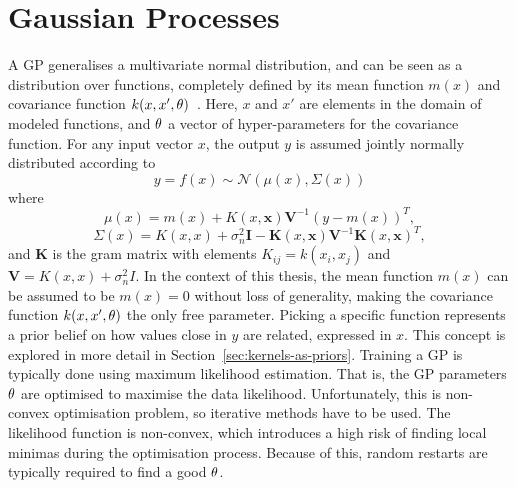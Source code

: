 
\section{Gaussian Processes}
A GP generalises a multivariate normal distribution, and can be seen
as a distribution over functions, completely defined by its
mean function $m(x)$ and covariance function $k(x, x', \theta)$~\cite{Rasmussen-Williams-2006}. 
Here, $x$ and $x'$ are
elements in the domain of modeled functions, and $\theta$ a
vector of hyper-parameters for the covariance function. For any input
vector $x$, the output $y$ is assumed jointly normally distributed according to
\begin{equation}
  \label{eq:gp}
  y = f(x) \sim \mathcal{N}(\mu(x), \Sigma(x))
\end{equation}
where
\begin{equation}
  \label{eq:gp-mean-function}
  \mu(x) = m(x) + K(x, \textbf{x})\textbf{V}^{-1}{(y-m(x))}^{T},
\end{equation}
\begin{equation}
  \label{eq:gp-covariance-function}
  \Sigma(x) = K(x, x) + \sigma^{2}_n\textbf{I} - \textbf{K}(x, \textbf{x})\textbf{V}^{-1}{\textbf{K}(x, \textbf{x})}^{T},
\end{equation}
and $\textbf{K}$ is the gram matrix with elements $K_{ij} = k(x_i, x_j)$ and $\textbf{V}
= K(x, x) + \sigma_n^2I$.
In the context of this thesis, the mean function $m(x)$ can be assumed to be $m(x) = 0$
without loss of generality, making the covariance function $k(x, x', \theta)$
the only free parameter. Picking a specific function represents a prior
belief on how values close in $y$ are related, expressed in $x$. This
concept is explored in more detail in Section~\ref{sec:kernels-as-priors}.
Training a GP is typically done using maximum likelihood
estimation. That is, the GP parameters $\theta$ are optimised to
maximise the data likelihood. Unfortunately, this is non-convex
optimisation problem, so
iterative methods have to be used. The likelihood function is
non-convex, which introduces a high risk of finding local minimas
during the optimisation process. Because of this, random restarts are
typically required to find a good $\theta$.

